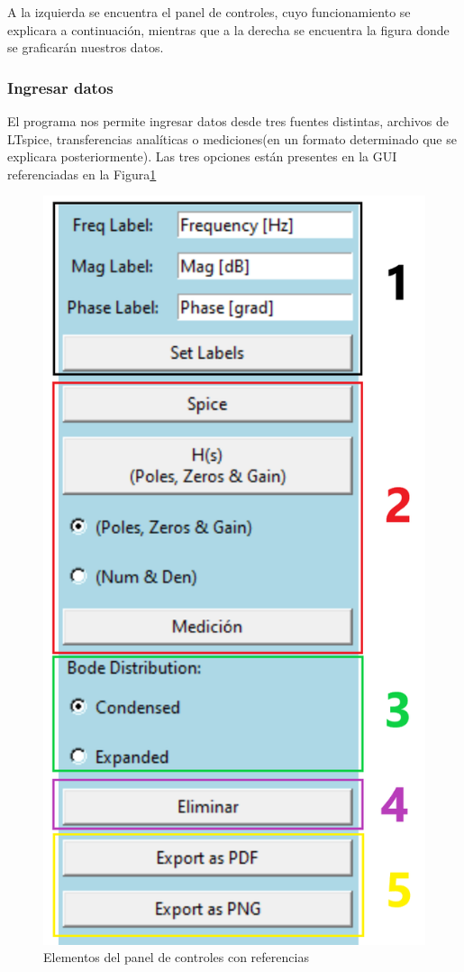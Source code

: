 \documentclass[10pt,a4paper]{article}
\begin{document}
A la izquierda se encuentra el panel de controles, cuyo funcionamiento se explicara a continuación, mientras que a la derecha se encuentra la figura donde se graficarán nuestros datos.

\subsubsection{Ingresar datos}
El programa nos permite ingresar datos desde tres fuentes distintas, archivos de LTspice, transferencias analíticas o mediciones(en un formato determinado que se explicara posteriormente). Las tres opciones están presentes en la GUI referenciadas en la Figura\ref{fig:controlPanel}

\begin{figure}[ht]
\centering
\includegraphics[scale=0.2]{controlPanel_ref.png}
\caption{Elementos del panel de controles con referencias}
\label{fig:controlPanel}
\end{figure}
\end{document}
